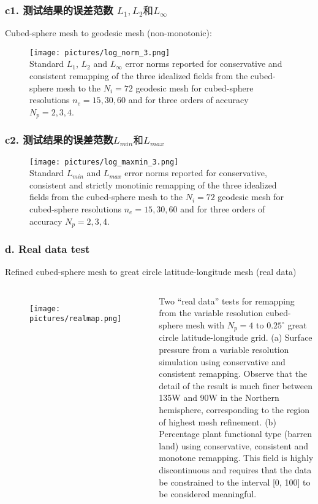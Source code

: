 \documentclass[unknownkeysallowed]{beamer}
\begin{document}
\begin{spacing}{1.2}
\begin{frame}
\frametitle{c1. 测试结果的误差范数 $L_1, L_2 \text{和}L_\infty$}
\scriptsize{Cubed-sphere mesh to geodesic mesh (non-monotonic):}
\begin{figure}[c]
\texttt{[image: pictures/log\_norm\_3.png]}\\
\tiny{Standard $L_1$, $L_2$ and $L_{\infty}$ error norms reported for conservative and consistent remapping
of the three idealized fields from the cubed-sphere mesh to the $N_i=72$ geodesic mesh for cubed-sphere resolutions $n_e = 15,30,60$ and for three orders of accuracy $N_p = 2,3,4$.}
\end{figure}
\end{frame}
\begin{frame}
\frametitle{c2. 测试结果的误差范数$L_{min} \text{和} L_{max}$}
\begin{figure}[c]
\texttt{[image: pictures/log\_maxmin\_3.png]}\\
\tiny{Standard $L_{min}$ and $L_{max}$ error norms reported for conservative, consistent and strictly monotinic remapping
of the three idealized fields from the cubed-sphere mesh to the $N_i=72$ geodesic mesh for cubed-sphere resolutions $n_e = 15,30,60$ and for three orders of accuracy $N_p = 2,3,4$.}
\end{figure}
\end{frame}




\begin{frame}
\frametitle{d. Real data test}
\scriptsize{Refined cubed-sphere mesh to great circle latitude-longitude mesh (real data)}
\begin{columns}[l]
\begin{figure}[c]
\texttt{[image: pictures/realmap.png]}
\end{figure}
\tiny{Two “real data” tests for remapping from the variable resolution cubed-sphere mesh with $N_p = 4$ to $0.25^\circ $ great circle latitude-longitude grid. \textcolor[rgb]{0,0,1}{(a)} Surface pressure
from a variable resolution simulation using \textcolor[rgb]{0,0,1}{conservative and consistent} remapping. Observe that
the detail of the result is much finer between 135W and 90W in the Northern hemisphere, corresponding
to the region of highest mesh refinement. \textcolor[rgb]{0,0,1}{(b)} Percentage plant functional type (barren
land) using \textcolor[rgb]{0,0,1}{conservative, consistent} and \textcolor[rgb]{1,0,0}{monotone} remapping. This field is highly \textcolor[rgb]{0,0,1}{discontinuous} and requires that the data be constrained to the interval [0, 100] to be considered meaningful.}


\end{columns}
\end{frame}
\end{spacing}
\end{document}
